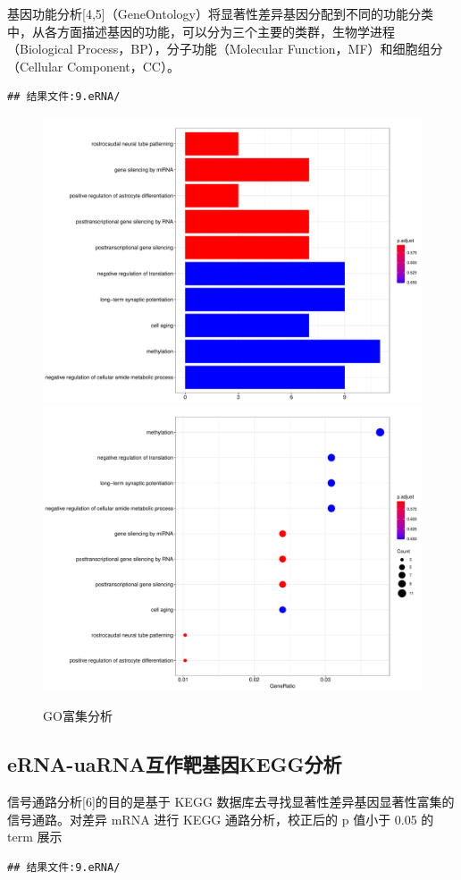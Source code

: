 \documentclass[
]{ctexart}
\begin{document}
基因功能分析{[}4,5{]}（GeneOntology）将显著性差异基因分配到不同的功能分类中，从各方面描述基因的功能，可以分为三个主要的类群，生物学进程（Biological Process，BP），分子功能（Molecular Function，MF）和细胞组分（Cellular Component，CC）。

\begin{verbatim}
## 结果文件:9.eRNA/
\end{verbatim}

\begin{figure}[H]

{\centering \includegraphics[width=0.48\linewidth]{./1.picture/eRNA_for_cluster_geneBPbar} \includegraphics[width=0.48\linewidth]{./1.picture/eRNA_for_cluster_geneBPdot} 

}

\caption{GO富集分析}\label{fig:unnamed-chunk-18}
\end{figure}

\hypertarget{erna-uarnaux4e92ux4f5cux9776ux57faux56e0keggux5206ux6790}{%
\subsection{eRNA-uaRNA互作靶基因KEGG分析}\label{erna-uarnaux4e92ux4f5cux9776ux57faux56e0keggux5206ux6790}}

信号通路分析{[}6{]}的目的是基于 KEGG 数据库去寻找显著性差异基因显著性富集的信号通路。对差异 mRNA 进行 KEGG 通路分析，校正后的 p 值小于 0.05 的 term 展示

\begin{verbatim}
## 结果文件:9.eRNA/
\end{verbatim}
\end{document}
